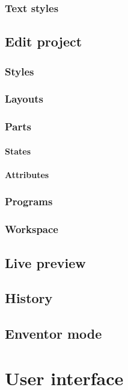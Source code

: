 \documentclass[titlepage,oneside,11pt]{book}
\begin{document}
\subsection{Text styles}
\section{Edit project}
\subsection{Styles}
\subsection{Layouts}
\subsection{Parts}
\subsubsection{States}
\subsubsection{Attributes}
\subsection{Programs}
\subsection{Workspace}
\section{Live preview}
\section{History}
\section{Enventor mode}
\chapter{User interface}
\end{document}
